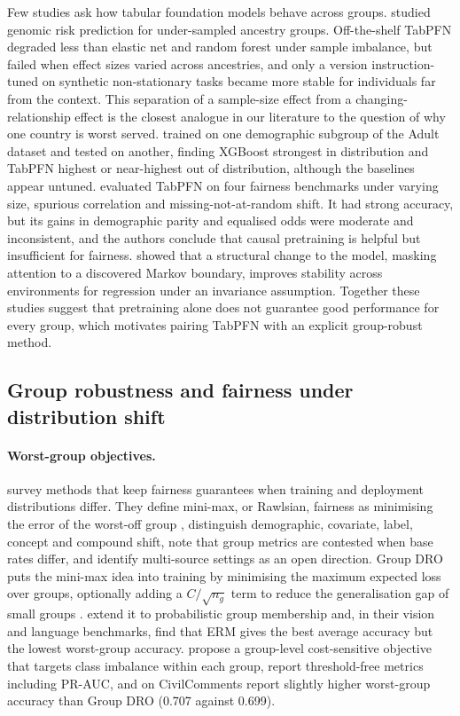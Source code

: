 \documentclass[11pt]{article}
\begin{document}
Few studies ask how tabular foundation models behave across groups. \citet{das2026bridging} studied genomic risk prediction for under-sampled ancestry groups. Off-the-shelf TabPFN degraded less than elastic net and random forest under sample imbalance, but failed when effect sizes varied across ancestries, and only a version instruction-tuned on synthetic non-stationary tasks became more stable for individuals far from the context. This separation of a sample-size effect from a changing-relationship effect is the closest analogue in our literature to the question of why one country is worst served. \citet{harijeyan2025evaluating} trained on one demographic subgroup of the Adult dataset and tested on another, finding XGBoost strongest in distribution and TabPFN highest or near-highest out of distribution, although the baselines appear untuned. \citet{liu2026causal} evaluated TabPFN on four fairness benchmarks under varying size, spurious correlation and missing-not-at-random shift. It had strong accuracy, but its gains in demographic parity and equalised odds were moderate and inconsistent, and the authors conclude that causal pretraining is helpful but insufficient for fairness. \citet{guan2026stablepfn} showed that a structural change to the model, masking attention to a discovered Markov boundary, improves stability across environments for regression under an invariance assumption. Together these studies suggest that pretraining alone does not guarantee good performance for every group, which motivates pairing TabPFN with an explicit group-robust method.

\subsection{Group robustness and fairness under distribution shift}

\paragraph{Worst-group objectives.} \citet{barrainkua2025preserving} survey methods that keep fairness guarantees when training and deployment distributions differ. They define mini-max, or Rawlsian, fairness as minimising the error of the worst-off group \citep[pp.~4--5]{barrainkua2025preserving}, distinguish demographic, covariate, label, concept and compound shift, note that group metrics are contested when base rates differ, and identify multi-source settings as an open direction. Group DRO puts the mini-max idea into training by minimising the maximum expected loss over groups, optionally adding a $C/\sqrt{n_g}$ term to reduce the generalisation gap of small groups \citep{ghosal2023distributionally, stahlschmidt2024domain}. \citet{ghosal2023distributionally} extend it to probabilistic group membership and, in their vision and language benchmarks, find that ERM gives the best average accuracy but the lowest worst-group accuracy. \citet{sulaiman2025advancing} propose a group-level cost-sensitive objective that targets class imbalance within each group, report threshold-free metrics including PR-AUC, and on CivilComments report slightly higher worst-group accuracy than Group DRO (0.707 against 0.699).
\end{document}
